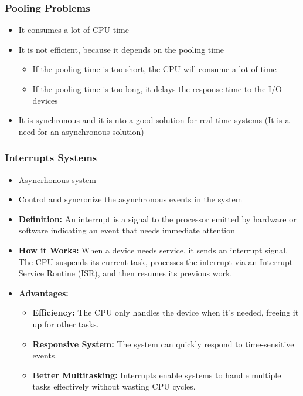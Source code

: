 
\begin{frame}
    \frametitle{Pooling Problems}
    \begin{itemize}
        \item It consumes a lot of CPU time
        \item It is not efficient, because it depends on the pooling time
        \begin{itemize}
            \item If the pooling time is too short, the CPU will consume a lot of time
            \item If the pooling time is too long, it delays the response time to the I/O devices
        \end{itemize}
        \item It is synchronous and it is nto a good solution for real-time systems (It is a need for an asynchronous solution)
    \end{itemize}
\end{frame}

\begin{frame}
    \frametitle{Interrupts Systems}
    \begin{itemize}
        \item Asyncrhonous system
        \item Control and syncronize the asynchronous events in the system
        \item \textbf{Definition:} An interrupt is a signal to the processor emitted by hardware or software indicating an event that needs immediate attention
        \item \textbf{How it Works:} When a device needs service, it sends an interrupt signal. The CPU suspends its current task, processes the interrupt via an Interrupt Service Routine (ISR), and then resumes its previous work.
        \item \textbf{Advantages:}
        \begin{itemize}
            \item \textbf{Efficiency:} The CPU only handles the device when it’s needed, freeing it up for other tasks.
            \item \textbf{Responsive System:} The system can quickly respond to time-sensitive events.
            \item \textbf{Better Multitasking:} Interrupts enable systems to handle multiple tasks effectively without wasting CPU cycles.
        \end{itemize}
    \end{itemize}
\end{frame}

